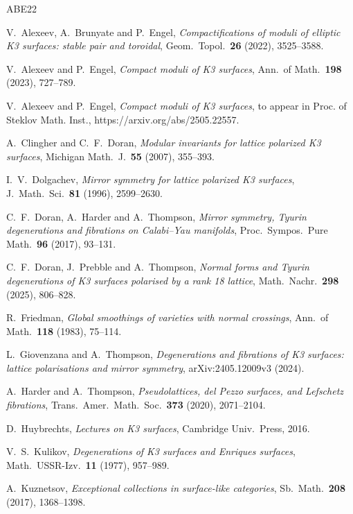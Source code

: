 \documentclass[11pt]{article}
\theoremstyle{definition}
\theoremstyle{remark}
\begin{document}
\begin{thebibliography}{ABE22}

V.~Alexeev, A.~Brunyate and P.~Engel,
\emph{Compactifications of moduli of elliptic K3 surfaces: stable pair
and toroidal}, Geom.\ Topol.\ \textbf{26} (2022), 3525--3588.

V.~Alexeev and P.~Engel,
\emph{Compact moduli of K3 surfaces},
Ann.\ of Math.\ \textbf{198} (2023), 727--789.

V.~Alexeev and P.~Engel,
\emph{Compact moduli of K3 surfaces}, to appear in Proc. of Steklov Math. Inst., https://arxiv.org/abs/2505.22557.

A.~Clingher and C.~F.~Doran,
\emph{Modular invariants for lattice polarized K3 surfaces},
Michigan Math.\ J.\ \textbf{55} (2007), 355--393.

I.~V.~Dolgachev,
\emph{Mirror symmetry for lattice polarized K3 surfaces},
J.\ Math.\ Sci.\ \textbf{81} (1996), 2599--2630.

C.~F.~Doran, A.~Harder and A.~Thompson,
\emph{Mirror symmetry, Tyurin degenerations and fibrations on
Calabi--Yau manifolds},
Proc.\ Sympos.\ Pure Math.\ \textbf{96} (2017), 93--131.

C.~F.~Doran, J.~Prebble and A.~Thompson,
\emph{Normal forms and Tyurin degenerations of K3 surfaces polarised
by a rank 18 lattice}, Math.\ Nachr.\ \textbf{298} (2025), 806--828.

R.~Friedman,
\emph{Global smoothings of varieties with normal crossings},
Ann.\ of Math.\ \textbf{118} (1983), 75--114.

L.~Giovenzana and A.~Thompson,
\emph{Degenerations and fibrations of K3 surfaces: lattice
polarisations and mirror symmetry}, arXiv:2405.12009v3 (2024).

A.~Harder and A.~Thompson,
\emph{Pseudolattices, del Pezzo surfaces, and Lefschetz fibrations},
Trans.\ Amer.\ Math.\ Soc.\ \textbf{373} (2020), 2071--2104.

D.~Huybrechts,
\emph{Lectures on K3 surfaces},
Cambridge Univ.\ Press, 2016.

V.~S.~Kulikov,
\emph{Degenerations of K3 surfaces and Enriques surfaces},
Math.\ USSR-Izv.\ \textbf{11} (1977), 957--989.

A.~Kuznetsov,
\emph{Exceptional collections in surface-like categories},
Sb.\ Math.\ \textbf{208} (2017), 1368--1398.


\end{thebibliography}
\end{document}
